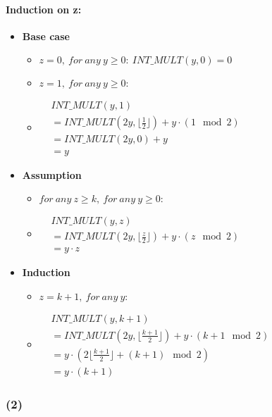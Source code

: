 \documentclass[11pt]{ctexart}
\begin{document}
	\paragraph{Induction on z:}\label{Induction_two}
	\begin{itemize}
		\item \textbf{Base case}
		\begin{itemize}
			\item {$z=0, \ for\ any\ y\geq0:\ INT\_MULT(y,0)=0$}
			\item{$z=1, \ for\ any\ y\geq0:$}
			\item[]{
				$
				\begin{aligned}
				&INT\_MULT(y,1)\\
				&=INT\_MULT(2y,\lfloor\frac{1}{2}\rfloor) + y\cdot(1\mod2)\\
				&=INT\_MULT(2y,0)+y\\
				&=y
				\end{aligned}
				$
			}
			
		\end{itemize}
		\item \textbf{Assumption}
		\begin{itemize}
			\item {$for\ any\ z \geq k,\ for\ any\ y \geq0:$}
			\item[] {
				$
				\begin{aligned}
				&INT\_MULT(y,z)\\
				&=INT\_MULT(2y,\lfloor\frac{z}{2}\rfloor) + y\cdot(z\mod2)\\
				&=y \cdot z
				\end{aligned}
				$			
			}
			
		\end{itemize}
		\item \textbf{Induction}
		\begin{itemize}
			\item {$z=k+1,\ for\ any\ y:$}
			\item[]{
				$
				\begin{aligned}
				& INT\_MULT(y,k+1)\\
				& =INT\_MULT(2y,\lfloor\frac{k+1}{2}\rfloor) + y\cdot(k+1\mod2)\\
				& =y\cdot(2 \lfloor\frac{k+1}{2}\rfloor+(k+1)\mod2)\\
				& =y\cdot (k+1)
				\end{aligned}
				$
			}
		\end{itemize}
	\end{itemize}
	\subsubsection*{(2)}
\end{document}
